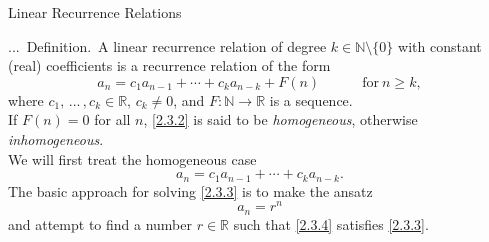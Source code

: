 \documentclass[smaller,hyperref={CJKbookmarks=true}]{beamer}
\newcommand{\N}{\mathbb{N}} \newcommand{\Z}{\mathbb{Z}} \newcommand{\Q}{\mathbb{Q}}
\newcommand{\R}{\mathbb{R}}
\newcounter{zhuo}[subsection]
\renewcommand{\thezhuo}{\thesection.\thesubsection.\arabic{zhuo}}
\newenvironment{DEFINITION}{\stepcounter{zhuo}\alert{\thezhuo.~Definition.\,}}{}
\begin{document}
\begin{frame}[t]{Linear Recurrence Relations}
\begin{spacing}{1.05}
\begin{DEFINITION}
A linear recurrence relation of degree $k\in\N\setminus\{0\}$ with constant (real) coefficients is a recurrence relation of the form
\begin{equation}\label{2.3.2}
a_n=c_1a_{n-1}+\cdots+c_ka_{n-k}+F(n)\qquad\quad
\text{for}~n\geq k,
\end{equation}
where $c_1,\,...\,,c_k\in\R,\,c_k\neq0$, and $F\!:\N\rightarrow\R$ is a sequence.\\[5pt]
If $F(n)=0$ for all $n$, \eqref{2.3.2} is said to be \emph{homogeneous}, otherwise \emph{inhomogeneous}.\\[5pt]
We will first treat the homogeneous case
\begin{equation}\label{2.3.3}
  a_n=c_1a_{n-1}+\cdots+c_ka_{n-k}.
\end{equation}
The basic approach for solving \eqref{2.3.3} is to make the ansatz
\begin{equation}\label{2.3.4}
  a_n=r^n
\end{equation}
and attempt to find a number $r\in\R$ such that \eqref{2.3.4} satisfies \eqref{2.3.3}.
\end{DEFINITION}
\end{spacing}
\end{frame}
\end{document}
